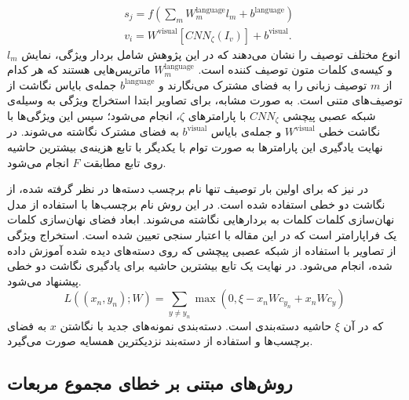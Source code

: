 \begin{align}
& s_j = f\left( \sum_m W^{\text{language}}_m l_m + b^{\text{language}} \right) \nonumber \\
& v_i = W^\text{visual} [CNN_{\zeta}(I_v)] + b^{\text{visual}}.
\end{align}
$l_m$
انوع مختلف توصیف را نشان می‌دهند که در این پژوهش شامل بردار ویژگی، نمایش   و کیسه‌ی کلمات  متون توصیف کننده است.
$ W^{\text{language}}_m $
ماتریس‌هایی هستند که هر کدام از $m$ توصیف زبانی را به فضای مشترک می‌نگارند و $b^{\text{language}}$ جمله‌ی بایاس نگاشت از توصیف‌های متنی است. به صورت مشابه، برای تصاویر ابتدا استخراج ویژگی به وسیله‌ی شبکه عصبی پیچشی $CNN_{\zeta}$ با پارامترهای $\zeta$، انجام می‌شود؛ سپس این ویژگی‌ها با نگاشت خطی $W^\text{visual}$ و جمله‌ی بایاس $ b^{\text{visual}}$ به فضای مشترک نگاشته می‌شوند.  در نهایت یادگیری این پارامترها به صورت توام با یکدیگر با تابع هزینه‌ی بیشترین حاشیه روی تابع مطابقت $F$ انجام می‌شود.


در
\cite{devise}
نیز که برای اولین بار توصیف تنها نام برچسب دسته‌ها در نظر گرفته شده، از نگاشت دو خطی استفاده شده است. در این روش نام برچسب‌ها با استفاده از مدل نهان‌سازی کلمات  کلمات به بردارهایی نگاشته می‌شوند. ابعاد فضای نهان‌سازی کلمات یک فراپارامتر است که در این مقاله با اعتبار سنجی تعیین شده است. استخراج ویژگی از  تصاویر  با استفاده از شبکه عصبی پیچشی
\cite{alexnet}
که روی دسته‌های دیده شده آموزش داده شده، انجام می‌شود. در نهایت یک تابع بیشترین حاشیه
برای یادگیری نگاشت دو خطی پیشنهاد می‌شود.
\begin{equation}
 L((x_n, y_n);W) = \sum_{y\neq y_n} \max(0, \xi  - x_nWc_{y_n} + x_nWc_y)
\end{equation}
که در آن $\xi$ حاشیه دسته‌بندی است. دسته‌بندی نمونه‌های جدید با نگاشتن $x$ به فضای برچسب‌ها و استفاده از دسته‌بند نزدیکترین همسایه صورت می‌گیرد.

\subsection{روش‌های مبتنی بر خطای مجموع مربعات} \label{mse_loss_methods}

